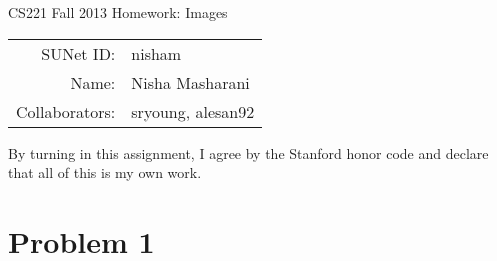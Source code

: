 \documentclass[12pt]{article}
\begin{document}
\begin{center}
{\Large CS221 Fall 2013 Homework: Images}

\begin{tabular}{rl}
SUNet ID: & nisham \\
Name: & Nisha Masharani \\
Collaborators: & sryoung, alesan92
\end{tabular}
\end{center}

By turning in this assignment, I agree by the Stanford honor code and declare
that all of this is my own work.

\section*{Problem 1}
\end{document}
